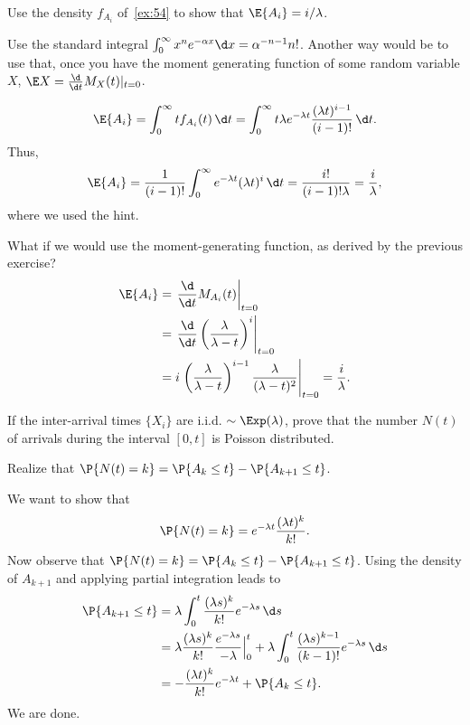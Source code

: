 \begin{extra}
 Use the density $f_{A_i}$ of~\cref{ex:54} to show that $\E{A_i}=i/\lambda$. 
\begin{hint}
Use the standard integral 
 $\int_0^\infty x^n e^{-\alpha x} \d x =
 \alpha^{-n-1}n!$. 
 Another way would be to use that, once you have the moment
 generating function of some random variable $X$,
 $\E X = \frac{\d}{\d t} M_X(t) |_{t=0}$. 
\end{hint}
\begin{solution}
 \begin{equation*}
\E{A_i} = \int_0^\infty t f_{A_i} (t) \, \d t = 
\int_0^\infty t \lambda e^{-\lambda t} \frac{(\lambda t)^{i-1}}{(i-1)!}\, \d t.
 \end{equation*}
Thus, 
 \begin{equation*}
\E{A_i} = \frac{1}{(i-1)!} \int_0^\infty e^{-\lambda t} (\lambda t)^i\,\d t = \frac{i!}{(i-1)!\lambda}=\frac{i}\lambda,
 \end{equation*}
 where we used the hint.

What if we would use the moment-generating function, as derived by the previous exercise?
\begin{align*}
 \E{A_i} 
&= \left.\frac{\d}{\d t} M_{A_i}(t)\right|_{t=0} \\
&= \left.\frac{\d}{\d t} \left(\frac{\lambda}{\lambda-t}\right)^i\right|_{t=0} \\
&= i \left.\left(\frac{\lambda}{\lambda-t}\right)^{i-1}\frac{\lambda}{(\lambda-t)^2}\right|_{t=0} 
= \frac i\lambda.
\end{align*}


\end{solution}
\end{extra}

\begin{exercise}
 If the inter-arrival times $\{X_i\}$ are i.i.d.
 $\sim \Exp(\lambda)$, prove that the number $N(t)$ of arrivals during the interval $[0,t]$ is Poisson distributed.
\begin{hint}
 Realize that
 $\P{N(t)=k} = \P{A_k \leq t} - \P{A_{k+1} \leq t}$.
\end{hint}
\begin{solution}
 We want to show that
 \begin{equation*}
 \P{N(t)=k} = e^{-\lambda t}\frac{(\lambda t)^k}{k!}.
 \end{equation*}
 Now observe that $\P{N(t)=k} = \P{A_k \leq t} - \P{A_{k+1} \leq t}$.
 Using the density of $A_{k+1}$ and applying partial integration leads to
\begin{align*}
\P{A_{k+1} \leq t} 
&= \lambda \int_0^t \frac{(\lambda s)^{k}}{k!}e^{-\lambda s}\, \d s \\
&= \lambda \frac{(\lambda s)^{k}}{k!}\frac{e^{-\lambda s}}{-\lambda} \Big|_{0}^t + \lambda \int_0^t \frac{(\lambda s)^{k-1}}{(k-1)!}e^{-\lambda s}\, \d s \\
&= - \frac{(\lambda t)^{k}}{k!} e^{-\lambda t} + \P{A_k \leq t}.
\end{align*}
We are done.
\end{solution}
\end{exercise}

